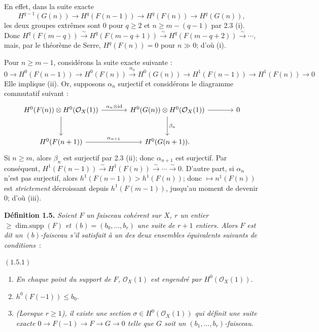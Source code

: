 En effet, dans la suite exacte
\[
H^{q-1}(G(n))\longrightarrow H^q(F(n-1))\longrightarrow H^q(F(n))\longrightarrow H^q(G(n)),
\]
les deux groupes extrêmes sont \(0\) pour \(q\ge2\) et \(n\ge m-(q-1)\) par 2.3 (i). Donc \(H^q(F(m-q))\xrightarrow{\sim}H^q(F(m-q+1))\xrightarrow{\sim}H^q(F(m-q+2))\xrightarrow{\sim}\cdots\), mais, par le théorème de Serre, \(H^q(F(n))=0\) pour \(n\gg0\); d'où (i).

Pour \(n\ge m-1\), considérons la suite exacte suivante :
\[
0\to H^0(F(n-1))\to H^0(F(n))
  \xrightarrow{\alpha_n}H^0(G(n))\to H^1(F(n-1))
  \to H^1(F(n))\to0
\]
Elle implique (ii). Or, supposons \(\alpha_n\) surjectif et considérons le diagramme commutatif suivant :
\[
\begin{tikzcd}[column sep=large,row sep=large]
H^0(F(n))\otimes H^0(\mathcal O_X(1))
  \arrow[r,"\alpha_n\otimes\mathrm{id}"]
  \arrow[d]
& H^0(G(n))\otimes H^0(\mathcal O_X(1))
  \arrow[r]
  \arrow[d,"\beta_n"]
& 0 \\
H^0(F(n+1))
  \arrow[r,"\alpha_{n+1}"]
& H^0(G(n+1)).
\end{tikzcd}
\]
Si \(n\ge m\),
alors \(\beta_n\) est surjectif par 2.3 (ii); donc \(\alpha_{n+1}\) est surjectif. Par conséquent, \(H^1(F(n-1))\xrightarrow{\sim}H^1(F(n))\xrightarrow{\sim}\cdots\xrightarrow{\sim}0\). D'autre part, si \(\alpha_n\) n'est pas surjectif, alors \(h^1(F(n-1))>h^1(F(n))\); donc \(\mapsto n^1(F(n))\) est \emph{strictement} décroissant depuis \(h^1(F(m-1))\), jusqu'au moment de devenir \(0\); d'où (iii).

\textbf{Définition 1.5.} \emph{Soient \(F\) un faisceau cohérent sur \(X\), \(r\) un entier \(\ge\operatorname{dim{.}supp}(F)\) et \((b)=(b_0,\ldots,b_r)\) une suite de \(r+1\) entiers. Alors \(F\) est dit un \emph{\((b)\)-faisceau} s'il satisfait à un des deux ensembles équivalents suivants de conditions}~:

\((1.5.1)\)
\begin{enumerate}[label=(\roman*)]
\item \emph{En chaque point du support de \(F\), \(\mathcal O_X(1)\) est engendré par \(H^0(\mathcal O_X(1))\).}
\item \emph{\(h^0(F(-1))\le b_0\).}
\item \emph{(Lorsque \(r\ge1\)), il existe une section \(\sigma\in H^0(\mathcal O_X(1))\) qui définit une suite exacte \(0\to F(-1)\to F\to G\to0\) telle que \(G\) soit un \((b_1,\ldots,b_r)\)-faisceau.}
\end{enumerate}

